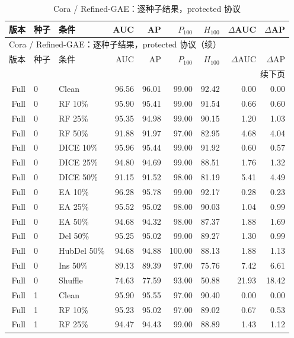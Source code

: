 {\footnotesize
\setlength{\tabcolsep}{3.2pt}
\renewcommand{\arraystretch}{1.10}
\begin{longtable}{rllrrrrrr}
\caption{Cora / Refined-GAE：逐种子结果，protected 协议}\\
\toprule
版本 & 种子 & 条件 & AUC & AP & $P_{100}$ & $H_{100}$ & $\Delta$AUC & $\Delta$AP \\
\midrule
\endfirsthead
\multicolumn{9}{l}{Cora / Refined-GAE：逐种子结果，protected 协议（续）}\\
\toprule
版本 & 种子 & 条件 & AUC & AP & $P_{100}$ & $H_{100}$ & $\Delta$AUC & $\Delta$AP \\
\midrule
\endhead
\midrule\multicolumn{9}{r}{续下页}\\
\endfoot
\bottomrule
\endlastfoot
Full & 0 & Clean & 96.56 & 96.01 & 99.00 & 92.42 & 0.00 & 0.00 \\
Full & 0 & RF 10\% & 95.90 & 95.41 & 99.00 & 91.54 & 0.66 & 0.60 \\
Full & 0 & RF 25\% & 95.35 & 94.98 & 99.00 & 90.15 & 1.20 & 1.03 \\
Full & 0 & RF 50\% & 91.88 & 91.97 & 97.00 & 82.95 & 4.68 & 4.04 \\
Full & 0 & DICE 10\% & 95.96 & 95.44 & 99.00 & 91.92 & 0.60 & 0.57 \\
Full & 0 & DICE 25\% & 94.80 & 94.69 & 99.00 & 88.51 & 1.76 & 1.32 \\
Full & 0 & DICE 50\% & 91.15 & 91.52 & 98.00 & 81.19 & 5.41 & 4.49 \\
Full & 0 & EA 10\% & 96.28 & 95.78 & 99.00 & 92.17 & 0.28 & 0.23 \\
Full & 0 & EA 25\% & 95.52 & 95.02 & 98.00 & 90.03 & 1.04 & 0.99 \\
Full & 0 & EA 50\% & 94.68 & 94.32 & 98.00 & 87.37 & 1.88 & 1.69 \\
Full & 0 & Del 50\% & 95.25 & 95.02 & 99.00 & 89.27 & 1.30 & 0.99 \\
Full & 0 & HubDel 50\% & 94.68 & 94.88 & 100.00 & 88.13 & 1.88 & 1.13 \\
Full & 0 & Ins 50\% & 89.13 & 89.39 & 97.00 & 75.76 & 7.42 & 6.61 \\
Full & 0 & Shuffle & 74.63 & 77.59 & 93.00 & 50.88 & 21.93 & 18.42 \\
Full & 1 & Clean & 95.90 & 95.55 & 97.00 & 90.40 & 0.00 & 0.00 \\
Full & 1 & RF 10\% & 95.23 & 95.02 & 97.00 & 89.02 & 0.67 & 0.53 \\
Full & 1 & RF 25\% & 94.47 & 94.43 & 99.00 & 88.89 & 1.43 & 1.12 \\

\end{longtable}}
